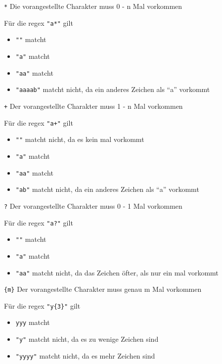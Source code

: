 \documentclass[ignorenonframetext,]{beamer}
\providecommand{\tightlist}{%
  \setlength{\itemsep}{0pt}\setlength{\parskip}{0pt}}
\begin{document}
\begin{frame}

\texttt{*} Die vorangestellte Charakter muss 0 - n Mal vorkommen

Für die regex \texttt{"a*"} gilt

\begin{itemize}
\tightlist
\item
  \texttt{""} matcht
\item
  \texttt{"a"} matcht
\item
  \texttt{"aa"} matcht
\item
  \texttt{"aaaab"} matcht nicht, da ein anderes Zeichen als ``a''
  vorkommt
\end{itemize}

\end{frame}

\begin{frame}

\texttt{+} Der vorangestellte Charakter muss 1 - n Mal vorkommen

Für die regex \texttt{"a+"} gilt

\begin{itemize}
\tightlist
\item
  \texttt{""} matcht nicht, da es kein mal vorkommt
\item
  \texttt{"a"} matcht
\item
  \texttt{"aa"} matcht
\item
  \texttt{"ab"} matcht nicht, da ein anderes Zeichen als ``a'' vorkommt
\end{itemize}

\end{frame}

\begin{frame}

\texttt{?} Der vorangestellte Charakter muss 0 - 1 Mal vorkommen

Für die regex \texttt{"a?"} gilt

\begin{itemize}
\tightlist
\item
  \texttt{""} matcht
\item
  \texttt{"a"} matcht
\item
  \texttt{"aa"} matcht nicht, da das Zeichen öfter, als nur ein mal
  vorkommt
\end{itemize}

\end{frame}

\begin{frame}

\texttt{\{m\}} Der vorangestellte Charakter muss genau m Mal vorkommen

Für die regex \texttt{"y\{3\}"} gilt

\begin{itemize}
\tightlist
\item
  \texttt{yyy} matcht
\item
  \texttt{"y"} matcht nicht, da es zu wenige Zeichen sind
\item
  \texttt{"yyyy"} matcht nicht, da es mehr Zeichen sind
\end{itemize}

\end{frame}
\end{document}
